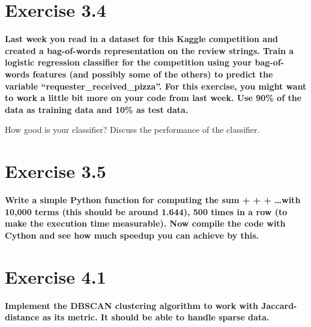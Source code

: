 \documentclass{article}
\begin{document}
\section{Exercise 3.4}
\textbf{Last week you read in a dataset for this Kaggle competition and created a bag-of-words representation on the review strings. Train a logistic regression classifier for the competition using your bag-of-words features (and possibly some of the others) to predict the variable “requester_received_pizza”. For this exercise, you might want to work a little bit more on your code from last week. Use 90\% of the data as training data and 10\% as test data.}

How good is your classifier? Discuss the performance of the classifier.


\section{Exercise 3.5}
\textbf{Write a simple Python function for computing the sum  +  +  + \ldots with 10,000 terms (this should be around 1.644), 500 times in a row (to make the execution time measurable). Now compile the code with Cython and see how much speedup you can achieve by this.}



\section{Exercise 4.1}
\textbf{Implement the DBSCAN clustering algorithm to work with Jaccard-distance as its metric. It should be able to handle sparse data.}


\end{document}
